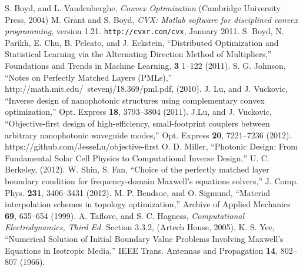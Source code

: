 \begin{thebibliography}{99.}%
 S. Boyd, and L. Vandenberghe, 
    \emph{Convex Optimization} 
    (Cambridge University Press, 2004)
 M. Grant and S. Boyd, \emph{CVX: Matlab software for disciplined convex programming}, version 1.21. \verb+http://cvxr.com/cvx+, January 2011.
 S. Boyd, N. Parikh, E. Chu, B. Peleato, and J. Eckstein, 
    ``Distributed Optimization and Statistical
    Learning via the Alternating Direction
    Method of Multipliers,''
    Foundations and Trends in Machine Learning, \textbf{3} 1–122 (2011).
 S. G. Johnson, ``Notes on Perfectly Matched Layers (PMLs),''
    http://math.mit.edu/~stevenj/18.369/pml.pdf, (2010). 
 J. Lu, and J. Vuckovic, 
    ``Inverse design of nanophotonic structures using complementary convex optimization,''
    Opt. Express \textbf{18}, 3793--3804 (2011). 
 J.Lu, and J. Vuckovic,
    ``Objective-first design of high-efficiency, small-footprint couplers between arbitrary nanophotonic waveguide modes,''
    Opt. Express \textbf{20}, 7221--7236 (2012).
 https://github.com/JesseLu/objective-first
 O. D. Miller, ``Photonic Design: From Fundamental Solar Cell Physics to Computational Inverse Design,''
    U. C. Berkeley, (2012).
 W. Shin, S. Fan, ``Choice of the perfectly matched layer boundary condition for frequency-domain Maxwell’s equations solvers,''
    J. Comp. Phys. \textbf{231}, 3406--3431 (2012).
 M. P. Bendsoe, and O. Sigmund, 
    ``Material interpolation schemes in topology optimization,''
    Archive of Applied Mechanics \textbf{69}, 635--654 (1999).
 A. Taflove, and S. C. Hagness, 
    \emph{Computational Electrodynamics, Third Ed.}
    Section 3.3.2, (Artech House, 2005).
 K. S. Yee,
    ``Numerical Solution of Initial Boundary Value Problems Involving
    Maxwell's Equations in Isotropic Media,''
    IEEE Trans. Antennas and Propagation \textbf{14}, 802--807 (1966).
\end{thebibliography}
